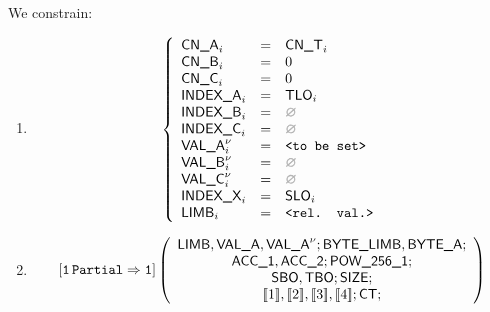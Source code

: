 \begin{center}
\end{center}

We constrain:
\begin{enumerate}
	\item 
\[
	\left\{
	\begin{array}{lclr}
		\cnA      _{i}       & = & \cnT_{i}            \\
		\cnB      _{i}       & = & 0                   \\
		\cnC      _{i}       & = & 0                   \\
		\indexA   _{i}       & = & \tlo_{i}            \\
		\indexB   _{i}       & = & \nothing            \\
		\indexC   _{i}       & = & \nothing            \\
		\valA     _{i}\new{} & = & \valueToBeSet       \\
		\valB     _{i}\new{} & = & \nothing            \\
		\valC     _{i}\new{} & = & \nothing            \\
		\indexX   _{i}       & = & \slo_{i}            \\
		\limb     _{i}       & = & \relevantValue      \\
	\end{array}
	\right.
\]
	\item 
\[
	\onePartialToOne
	\left(
	\begin{array}{c}
		\limb{}, \valA{}, \valA\new{};
		\byteLimb{}, \byteA{};\\
		\acc{1}, \acc{2}; \pow{1}; \\
		\sbo{}, \tbo{}; \size{};\\
		\bit{1}, \bit{2}, \bit{3}, \bit{4}; \ct{};
	\end{array}
	\right)
\]
\end{enumerate}
